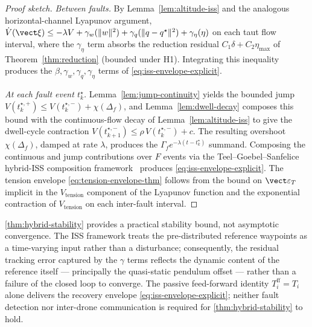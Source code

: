 \begin{proof}[Proof sketch]
\textit{Between faults.} By Lemma~\ref{lem:altitude-iss} and the analogous horizontal-channel Lyapunov argument, $\dot V(\vect\xi) \le -\lambda V + \gamma_w(\|w\|^2) + \gamma_q(\|q - q^\star\|^2) + \gamma_\eta(\eta)$ on each taut flow interval, where the $\gamma_\eta$ term absorbs the reduction residual $C_1\delta + C_2\eta_{\max}$ of Theorem~\ref{thm:reduction} (bounded under H1). Integrating this inequality produces the $\beta, \gamma_w, \gamma_q, \gamma_\eta$ terms of \eqref{eq:iss-envelope-explicit}.

\textit{At each fault event $t_k^\star$.} Lemma~\ref{lem:jump-continuity} yields the bounded jump $V(t_k^{\star,+}) \le V(t_k^{\star,-}) + \chi(\Delta_f)$, and Lemma~\ref{lem:dwell-decay} composes this bound with the continuous-flow decay of Lemma~\ref{lem:altitude-iss} to give the dwell-cycle contraction $V(t_{k+1}^{\star,-}) \le \rho\,V(t_k^{\star,-}) + c$. The resulting overshoot $\chi(\Delta_f)$, damped at rate $\lambda$, produces the $\Gamma_f e^{-\lambda(t - t_k^\star)}$ summand. Composing the continuous and jump contributions over $F$ events via the Teel--Goebel--Sanfelice hybrid-ISS composition framework~\cite{GoebelSanfeliceTeel2012} produces \eqref{eq:iss-envelope-explicit}. The tension envelope \eqref{eq:tension-envelope-thm} follows from the bound on $\vect\varepsilon_T$ implicit in the $V_{\mathrm{tension}}$ component of the Lyapunov function and the exponential contraction of $V_{\mathrm{tension}}$ on each inter-fault interval.
\end{proof}



\begin{remark}
\cref{thm:hybrid-stability} provides a practical stability bound, not asymptotic convergence. The ISS framework treats the pre-distributed reference waypoints as a time-varying input rather than a disturbance; consequently, the residual tracking error captured by the $\gamma$ terms reflects the dynamic content of the reference itself --- principally the quasi-static pendulum offset --- rather than a failure of the closed loop to converge. The passive feed-forward identity $T_i^{\mathrm{ff}} = T_i$ alone delivers the recovery envelope \eqref{eq:iss-envelope-explicit}; neither fault detection nor inter-drone communication is required for \cref{thm:hybrid-stability} to hold.
\end{remark}

